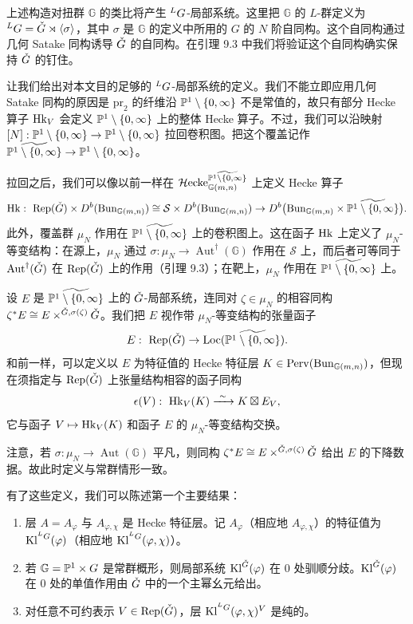 上述构造对扭群 $\mathbb{G}$ 的类比将产生 ${}^L G$-局部系统。这里把 $\mathbb{G}$ 的 $L$-群定义为 ${}^L G=\check G\rtimes\langle\sigma\rangle$，其中 $\sigma$ 是 $\mathbb{G}$ 的定义中所用的 $G$ 的 $N$ 阶自同构。这个自同构通过几何 Satake 同构诱导 $\check G$ 的自同构。在引理 9.3 中我们将验证这个自同构确实保持 $\check G$ 的钉住。

让我们给出对本文目的足够的 ${}^L G$-局部系统的定义。我们不能立即应用几何 Satake 同构的原因是 $\mathrm{pr}_2$ 的纤维沿 $\mathbb{P}^1\setminus\{0,\infty\}$ 不是常值的，故只有部分 Hecke 算子 $\mathrm{Hk}_V$ 会定义 $\mathbb{P}^1\setminus\{0,\infty\}$ 上的整体 Hecke 算子。不过，我们可以沿映射 $[N]:\mathbb{P}^1\setminus\{0,\infty\}\to\mathbb{P}^1\setminus\{0,\infty\}$ 拉回卷积图。把这个覆盖记作 $\widetilde{\mathbb{P}^1\setminus\{0,\infty\}}\to\mathbb{P}^1\setminus\{0,\infty\}$。

拉回之后，我们可以像以前一样在 $\mathcal{H}\mathrm{ecke}^{\widetilde{\mathbb{P}^1\setminus\{0,\infty\}}}_{\mathbb{G}(m,n)}$ 上定义 Hecke 算子
\[
\mathrm{Hk}:\ \mathrm{Rep}(\check G)\times D^b(\mathrm{Bun}_{\mathbb{G}(m,n)})\cong\mathcal S\times D^b(\mathrm{Bun}_{\mathbb{G}(m,n)})\to D^b\big(\mathrm{Bun}_{\mathbb{G}(m,n)}\times\widetilde{\mathbb{P}^1\setminus\{0,\infty\}}\big).
\]
此外，覆盖群 $\mu_N$ 作用在 $\widetilde{\mathbb{P}^1\setminus\{0,\infty\}}$ 上的卷积图上。这在函子 $\mathrm{Hk}$ 上定义了 $\mu_N$-等变结构：在源上，$\mu_N$ 通过 $\sigma:\mu_N\to\operatorname{Aut}^\dagger(\mathbb{G})$ 作用在 $\mathcal S$ 上，而后者可等同于 $\operatorname{Aut}^\dagger(\check G)$ 在 $\mathrm{Rep}(\check G)$ 上的作用（引理 9.3）；在靶上，$\mu_N$ 作用在 $\widetilde{\mathbb{P}^1\setminus\{0,\infty\}}$ 上。

设 $E$ 是 $\widetilde{\mathbb{P}^1\setminus\{0,\infty\}}$ 上的 $\check G$-局部系统，连同对 $\zeta\in\mu_N$ 的相容同构 $\zeta^*E\cong E\times^{\check G,\sigma(\zeta)}\check G$。我们把 $E$ 视作带 $\mu_N$-等变结构的张量函子
\[
E:\ \Rep(\ckG)\to\Loc(\widetilde{\PP^1\setminus\{0,\infty\}}).
\]
和前一样，可以定义以 $E$ 为特征值的 Hecke 特征层 $K\in\mathrm{Perv}(\mathrm{Bun}_{\mathbb{G}(m,n)})$，但现在须指定与 $\mathrm{Rep}(\check G)$ 上张量结构相容的函子同构
\[
\epsilon(V):\ \Hk_V(K)\xrightarrow{\ \sim\ }K\boxtimes E_V,
\]
它与函子 $V\mapsto\mathrm{Hk}_V(K)$ 和函子 $E$ 的 $\mu_N$-等变结构交换。

注意，若 $\sigma:\mu_N\to\operatorname{Aut}(\mathbb{G})$ 平凡，则同构 $\zeta^*E\cong E\times^{\check G,\sigma(\zeta)}\check G$ 给出 $E$ 的下降数据。故此时定义与常群情形一致。

有了这些定义，我们可以陈述第一个主要结果：

\begin{mainthm}[1]
\begin{enumerate}[label=(\arabic*), leftmargin=1.9em, itemsep=.25em]
\item 层 $A=A_\varphi$ 与 $A_{\varphi,\chi}$ 是 Hecke 特征层。记 $A_\varphi$（相应地 $A_{\varphi,\chi}$）的特征值为 $\mathrm{Kl}^{{}^L G}(\varphi)$（相应地 $\mathrm{Kl}^{{}^L G}(\varphi,\chi)$）。
\item 若 $\mathbb{G}=\mathbb{P}^1\times G$ 是常群概形，则局部系统 $\mathrm{Kl}^{\check G}(\varphi)$ 在 $0$ 处驯顺分歧。$\mathrm{Kl}^{\check G}(\varphi)$ 在 $0$ 处的单值作用由 $\check G$ 中的一个主幂幺元给出。
\item 对任意不可约表示 $V\in\mathrm{Rep}(\check G)$，层 $\mathrm{Kl}^{{}^L G}(\varphi,\chi)^V$ 是纯的。
\end{enumerate}
\end{mainthm}

